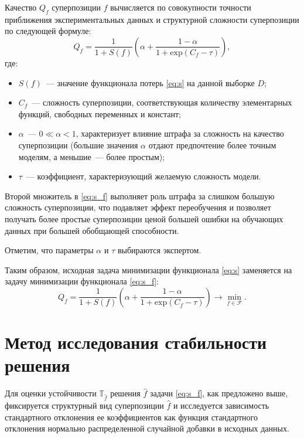 \documentclass[11pt,a4paper]{article}
\theoremstyle{definition}
\begin{document}
Качество $Q_f$ суперпозиции $f$ вычисляется по совокупности точности приближения
экспериментальных данных и структурной сложности суперпозиции по следующей формуле:
\begin{equation}
  Q_f = \frac{1}{1 + S(f)} \left(\alpha + \frac{1 - \alpha}{1 + \text{exp} (C_f - \tau)}\right),
  \label{eq:s_f}
\end{equation}
где:
\begin{itemize}
  \item[] $S(f)$~--- значение функционала потерь \eqref{eq:s} на данной выборке $D$;
  \item[] $C_f$~--- сложность суперпозиции, соответствующая количеству элементарных
	функций, свободных переменных и констант;
  \item[] $\alpha$~--- $0 \ll \alpha < 1$, характеризует влияние штрафа за сложность
	на качество суперпозиции (большие значения $\alpha$ отдают предпочтение более
	точным моделям, а меньшие~--- более простым);
  \item[] $\tau$~--- коэффициент, характеризующий желаемую сложность модели.
\end{itemize}

Второй множитель в \eqref{eq:s_f} выполняет роль штрафа за слишком
большую сложность суперпозиции, что подавляет эффект переобучения и позволяет
получать более простые суперпозиции ценой большей ошибки на обучающих данных
при большей обобщающей способности.

Отметим, что параметры $\alpha$ и $\tau$ выбираются экспертом.

Таким образом, исходная задача минимизации функционала \eqref{eq:s} заменяется
на задачу минимизации функционала \eqref{eq:s_f}:
\begin{equation}
  Q_f = \frac{1}{1 + S(f)} \left(\alpha + \frac{1 - \alpha}{1 + \text{exp} (C_f - \tau)}\right) \rightarrow \min_{f \in \mathcal{F}}.
  \label{eq:s_f_min}
\end{equation}

\section{Метод исследования стабильности решения}

Для оценки устойчивости $\mathbb{T}_{\hat{f}}$ решения $\hat{f}$ задачи
\eqref{eq:s_f}, как предложено выше, фиксируется структурный вид суперпозиции
$\hat{f}$ и исследуется зависимость стандартного отклонения ее коэффициентов
как функция стандартного отклонения нормально распределенной случайной добавки
в исходных данных.
\end{document}
